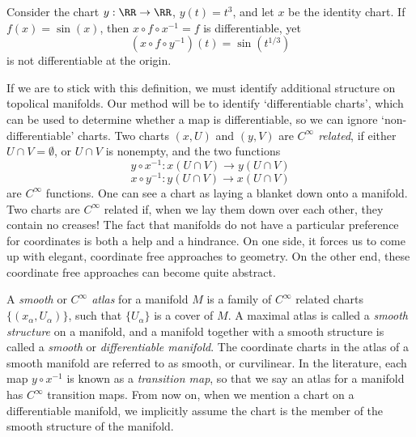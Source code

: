 \begin{example}
    Consider the chart $y: \RR \to \RR$, $y(t) = t^3$, and let $x$ be the identity chart. If $f(x) = \sin(x)$, then $x \circ f \circ x^{-1} = f$ is differentiable, yet
    \[ (x \circ f \circ y^{-1})(t) = \sin( t^{1/3} ) \]
    is not differentiable at the origin.
\end{example}

If we are to stick with this definition, we must identify additional structure on topolical manifolds. Our method will be to identify `differentiable charts', which can be used to determine whether a map is differentiable, so we can ignore `non-differentiable' charts. Two charts $(x,U)$ and $(y,V)$ are \emph{$C^\infty$ related}, if either $U \cap V = \emptyset$, or $U \cap V$ is nonempty, and the two functions
%
\[ y \circ x^{-1} : x(U \cap V) \to y(U \cap V) \]
%
\[ x \circ y^{-1} : y(U \cap V) \to x(U \cap V) \]
%
are $C^\infty$ functions. One can see a chart as laying a blanket down onto a manifold. Two charts are $C^\infty$ related if, when we lay them down over each other, they contain no creases! The fact that manifolds do not have a particular preference for coordinates is both a help and a hindrance. On one side, it forces us to come up with elegant, coordinate free approaches to geometry. On the other end, these coordinate free approaches can become quite abstract.

A \emph{smooth} or \emph{$C^\infty$ atlas} for a manifold $M$ is a family of $C^\infty$ related charts $\{ (x_\alpha, U_\alpha) \}$, such that $\{ U_\alpha \}$ is a cover of $M$. A maximal atlas is called a \emph{smooth structure} on a manifold, and a manifold together with a smooth structure is called a \emph{smooth} or \emph{differentiable manifold}. The coordinate charts in the atlas of a smooth manifold are referred to as smooth, or curvilinear. In the literature, each map $y \circ x^{-1}$ is known as a \emph{transition map}, so that we say an atlas for a manifold has $C^\infty$ transition maps. From now on, when we mention a chart on a differentiable manifold, we implicitly assume the chart is the member of the smooth structure of the manifold.

